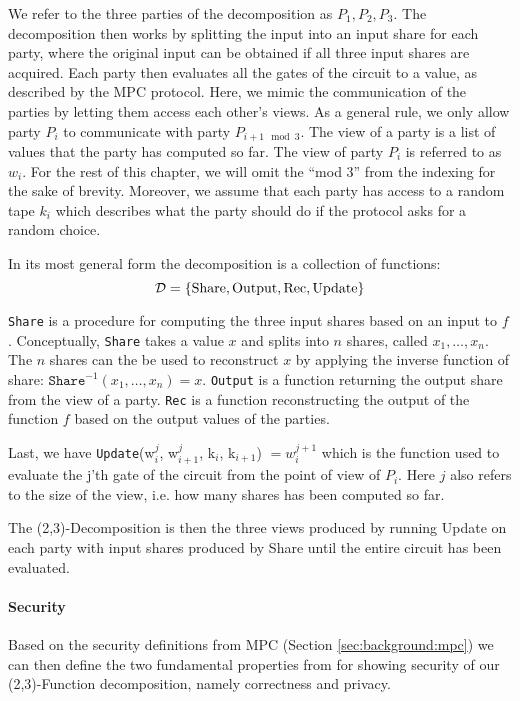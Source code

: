 We refer to the three parties of the decomposition as $P_{1}, P_{2}, P_{3}$. The
decomposition then works by splitting the input into an input share for each
party, where the original input can be obtained if all three input shares are
acquired.
Each party then evaluates all the gates of the circuit to a value, as described by
the MPC protocol. Here, we mimic the communication of the parties by letting
them access each other's views. As a general rule, we only allow party $P_{i}$ to
communicate with party $P_{i+1 \mod 3}$.
The view of a party is a list of values that the party has computed so far.
The view of party $P_{i}$ is referred to as $w_{i}$.
For the rest of this chapter, we will omit the ``mod 3'' from the
indexing for the sake of brevity.
Moreover, we assume that each party has access to a random tape $k_{i}$
which describes what the party should do if the protocol asks for a random
choice.

\begin{definition}
  In its most general form the decomposition is a collection of functions:
  \[
    \mathcal{D} = \{\text{Share}, \text{Output}, \text{Rec}, \text{Update}\}
  \]

  \texttt{Share} is a procedure for computing the three input shares based on an
  input to $f$. Conceptually, \texttt{Share} takes a value $x$ and splits into
  $n$ shares, called $x_{1}, \dots, x_{n}$. The $n$ shares can the be used to
  reconstruct $x$ by applying the inverse function of share:
  $\texttt{Share}^{-1}(x_{1}, \dots , x_{n}) = x$.
  \texttt{Output} is a function returning the output share from the view of a party.
  \texttt{Rec} is a function reconstructing the output of the function $f$ based on the
  output values of the parties.

  Last, we have \texttt{Update}(w$^{j}_{i}$, w$^{j}_{i+1}$, k$_{i}$, k$_{i+1}$) $= w^{j+1}_{i}$ which
  is the function used to evaluate the j'th gate of the circuit from the point
  of view of $P_{i}$. Here
  $j$ also refers to the size of the view, i.e. how many shares has been
  computed so far.
\end{definition}

The (2,3)-Decomposition is then the three views produced by running Update on
each party with input shares produced by Share until the entire circuit has been
evaluated.

\paragraph{Security}
Based on the security definitions from MPC (Section \ref{sec:background:mpc}) we
can then define the two fundamental properties from \cite{zkboo} for showing security of
our (2,3)-Function decomposition, namely correctness and privacy.

